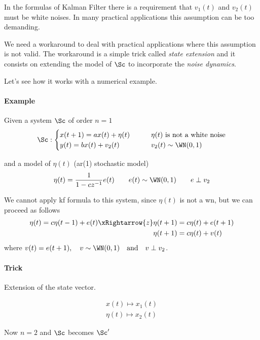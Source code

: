 \begin{rem}
    In the formulas of Kalman Filter there is a requirement that $v_1(t)$ and $v_2(t)$ must be white noises.
    In many practical applications this assumption can be too demanding.

    We need a workaround to deal with practical applications where this assumption is not valid.
    The workaround is a simple trick called \emph{state extension} and it consists on extending the model of $\Sc$ to incorporate the \emph{noise dynamics}.

    Let's see how it works with a numerical example.

    \paragraph{Example}

    Given a system $\Sc$ of order $n=1$
    \[
        \Sc:
        \begin{cases}
            x(t+1) = ax(t) + \eta(t) \qquad & \eta(t) \text{ is not a white noise}\\
            y(t) = bx(t) + v_2(t) \qquad & v_2(t) \sim \WN(0,1)
        \end{cases}
    \]

    and a model of $\eta(t)$ (\acrshort{ar}(1) stochastic model)
    \[
        \eta(t) = \frac{1}{1-cz^{-1}}e(t) \qquad e(t) \sim \WN(0,1) \qquad e \perp v_2
    \]
   
    We cannot apply \gls{kf} formula to this system, since $\eta(t)$ is not a \gls{wn}, but we can proceed as follows
    \begin{align*}
        \eta(t) = c\eta(t-1) + e(t) \xRightarrow{z} \eta(t+1) &= c\eta(t) + e(t+1) \\
        \eta(t+1) &= c\eta(t) + v(t)
    \end{align*}
    where $v(t) = e(t+1), \quad v \sim \WN(0,1) \quad \text{and} \quad v \perp v_2$.

    \paragraph{Trick} Extension of the state vector.

    \begin{align*}
        x(t) \mapsto x_1(t) \\
        \eta(t) \mapsto x_2(t)
    \end{align*}

    Now $n=2$ and $\Sc$ becomes $\Sc'$


\end{rem}
